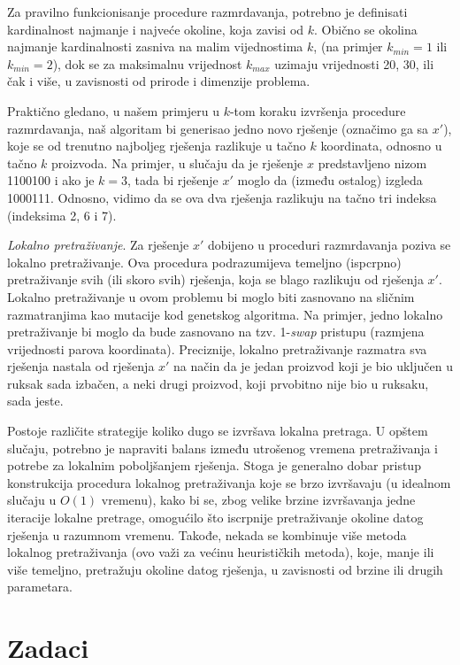 \documentclass[a4paper, utf8, 11pt, colorlinks]{book}
\begin{document}
Za pravilno funkcionisanje procedure razmrdavanja, potrebno je definisati kardinalnost najmanje i najveće okoline, koja zavisi od $k$. Obično se okolina najmanje kardinalnosti zasniva na malim vijednostima $k$, (na primjer $k_{min}=1$ ili $k_{min}=2$), dok se za maksimalnu vrijednost $k_{max}$  uzimaju vrijednosti 20, 30, ili čak i više, u zavisnosti od prirode i dimenzije problema.

Praktično gledano, u našem primjeru u $k$-tom koraku izvršenja procedure razmrdavanja, naš algoritam bi generisao jedno novo rješenje (označimo ga sa $x'$), koje se od trenutno najboljeg rješenja razlikuje u tačno $k$ koordinata, odnosno u tačno $k$ proizvoda. Na primjer, u slučaju da je rješenje $x$ predstavljeno nizom 1100100 i ako je $k=3$, tada bi rješenje    $x'$ moglo da  (između ostalog) izgleda
1000111. Odnosno, vidimo da se ova dva rješenja razlikuju na tačno tri indeksa (indeksima 2, 6 i 7).

\emph{Lokalno pretraživanje}. 
Za rješenje  $x'$ dobijeno u  proceduri razmrdavanja poziva se lokalno pretraživanje. Ova procedura podrazumijeva temeljno (ispcrpno) pretraživanje svih (ili skoro svih) rješenja, koja se blago razlikuju od rješenja  $x'$. Lokalno pretraživanje u ovom problemu bi moglo biti zasnovano na sličnim razmatranjima kao mutacije kod genetskog algoritma. Na primjer, jedno lokalno pretraživanje bi moglo da bude zasnovano na tzv. 1-\emph{swap} pristupu (razmjena vrijednosti parova koordinata). Preciznije, lokalno pretraživanje razmatra sva rješenja nastala od rješenja $x'$ na način da je jedan proizvod koji je bio uključen u ruksak sada izbačen, a neki drugi proizvod, koji prvobitno nije bio u ruksaku, sada jeste.

Postoje različite strategije koliko dugo se izvršava lokalna pretraga. U opštem slučaju, potrebno je napraviti balans između utrošenog vremena pretraživanja i potrebe za lokalnim poboljšanjem rješenja. Stoga je generalno dobar pristup konstrukcija  procedura lokalnog pretraživanja koje se brzo izvršavaju (u idealnom slučaju u $O(1)$ vremenu), kako bi se, zbog velike brzine izvršavanja jedne iteracije lokalne pretrage, omogućilo što iscrpnije pretraživanje okoline datog rješenja u razumnom vremenu. Takođe, nekada se kombinuje više metoda lokalnog pretraživanja (ovo važi za većinu heurističkih metoda), koje, manje ili više temeljno, pretražuju okoline datog rješenja, u zavisnosti od brzine ili drugih parametara.



\section{Zadaci}
\end{document}

